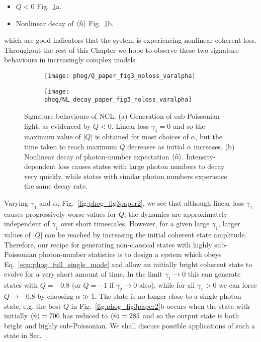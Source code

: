 \begin{itemize}
\item $Q < 0$ Fig.~\ref{fig:phog_fig3paper}a.
\item Nonlinear decay of $\ev{\hat{n}}$ Fig.~\ref{fig:phog_fig3paper}b.
\end{itemize}

\noindent which are good indicators that the system is experiencing nonlinear coherent loss. Throughout the rest of this Chapter we hope to observe these two signature behaviours in increasingly complex models.

\begin{figure}[htp]
\centering
	\begin{subfigure}{0.6\linewidth}
	\centering
	\caption{}
	\texttt{[image: phog/Q\_paper\_fig3\_noloss\_varalpha]}
	\end{subfigure}
	\begin{subfigure}{0.6\linewidth}
	\centering
	\caption{}
	\texttt{[image: phog/NL\_decay\_paper\_fig3\_noloss\_varalpha]}
	\end{subfigure}
\caption{\label{fig:phog_fig3paper} Signature behaviours of NCL. (a) Generation of sub-Poissonian light, as evidenced by $Q<0$. Linear loss $\gamma_1=0$ and so the maximum value of $\left|Q\right|$ is obtained for most choices of $\alpha$, but the time taken to reach maximum $Q$ decreases as initial $\alpha$ increases. (b) Nonlinear decay of photon-number expectation $\ev{\hat{n}}$. Intensity-dependent loss causes states with large photon numbers to decay very quickly, while states with similar photon numbers experience the same decay rate.}
\end{figure}

Varying $\gamma_1$ and $\alpha$, Fig.~\ref{fig:phog_fig3paper2}, we see that although linear loss $\gamma_1$ causes progressively worse values for $Q$, the dynamics are approximately independent of $\gamma_1$ over short timescales. However, for a given large $\gamma_1$, larger values of $\left|Q\right|$ can be reached by increasing the initial coherent state amplitude. Therefore, our recipe for generating non-classical states with highly sub-Poissonian photon-number statistics is to design a system which obeys Eq.~\ref{eqn:phog_full_single_mode} and allow an initially bright coherent state to evolve for a very short amount of time. In the limit $\gamma_1 \rightarrow 0$ this can generate states with $Q = -0.8$ (or $Q=-1$ if $\gamma_2 \rightarrow 0$ also), while for all $\gamma_1 > 0$ we can force $Q \rightarrow -0.8$ by choosing $\alpha \gg 1$. The state is no longer close to a single-photon state, e.g. the best $Q$ in Fig.~\ref{fig:phog_fig3paper2}b occurs when the state with initially $\ev{\hat{n}}=700$ has reduced to $\ev{\hat{n}} = 285$ and so the output state is both bright and highly sub-Poissonian. We shall discuss possible applications of such a state in Sec.~.

